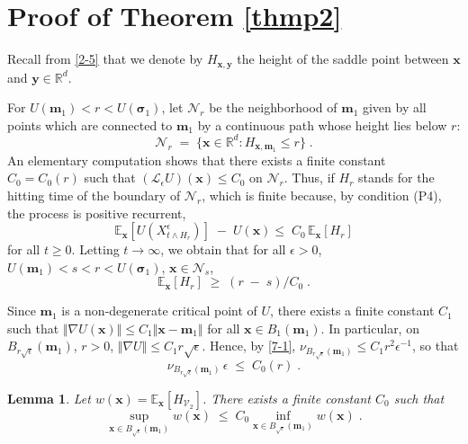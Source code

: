 \documentclass[reqno]{amsart}
\newtheorem{lemma}[theorem]{Lemma}
\newcommand{\mc}[1]{{\mathcal #1}}
\newcommand{\bb}[1]{{\mathbb #1}}
\newcommand{\bs}[1]{{\boldsymbol #1}}
\newcommand{\<}{\langle}
\renewcommand{\>}{\rangle}
\begin{document}
\section{Proof of Theorem \ref{thmp2}}
\label{sec8}

Recall from \eqref{2-5} that we denote by $H_{\bs x, \bs y}$ the
height of the saddle point between $\bs x$ and $\bs y\in\bb R^d$.

For $U(\bs m_1) < r< U(\bs \sigma_1)$, let $\mc N_r$ be the
neighborhood of $\bs m_1$ given by all points which are connected to
$\bs m_1$ by a continuous path whose height lies below $r$:
\begin{equation*}
\mc N_r \;=\; \big\{\bs x \in\bb R^d : H_{\bs x, \bs m_1} \le
r\big\}\;.
\end{equation*}
An elementary computation shows that there exists a finite constant
$C_0 = C_0(r)$ such that $(\mc L_\epsilon U)(\bs x) \le C_0$ on $\mathscr{N}_r$. Thus, if $H_r$ stands for the hitting time of the boundary of
$\mc N_r$, which is finite because, by condition (P4), the process is
positive recurrent,
\begin{equation*}
\bb E_{\bs x}[U(X^\epsilon_{t\wedge H_r})] \;-\; U(\bs x) \le\; C_0 \,
\bb E_{\bs x}[H_r]
\end{equation*}
for all $t\ge 0$. Letting $t\to\infty$, we obtain that for all
$\epsilon >0$, $U(\bs m_1) < s< r< U(\bs \sigma_1)$, $\bs x \in \mc
N_s$,
\begin{equation}
\label{7-7}
\bb E_{\bs x}[H_r] \;\ge\; (r\;-\; s)/C_0\;.
\end{equation}

Since $\bs m_1$ is a non-degenerate critical point of $U$, there
exists a finite constant $C_1$ such that $\Vert \nabla U (\bs x) \Vert
\le C_1 \Vert \bs x -\bs m_1\Vert$ for all $\bs x\in B_1(\bs m_1)$. In
particular, on $B_{r\sqrt{\epsilon}}(\bs m_1)$, $r>0$, $\Vert \nabla U
\Vert \le C_1 r \sqrt{\epsilon}$. Hence, by \eqref{7-1}, $\nu_{B_{r
    \sqrt{\epsilon}}(\bs m_1)} \le C_1 r^2 \epsilon^{-1}$, so that
\begin{equation}
\label{7-2}
\nu_{B_{r \sqrt{\epsilon}}(\bs m_1)} \, \epsilon \;\le\; C_0(r)\;.
\end{equation}

\begin{lemma}
\label{7-l3}
Let $w(\bs{x})=\mathbb{E}_{\bs{x}}[H_{\mc V_2}]$.  There exists a
finite constant $C_0$ such that
\begin{equation*}
\sup_{\bs x \in B_{\sqrt{\epsilon}}(\bs m_1)} w(\bs x)  \;\le\; C_0
\inf_{\bs x \in B_{\sqrt{\epsilon}}(\bs m_1)} w(\bs x) \;.
\end{equation*}
\end{lemma}
\end{document}
